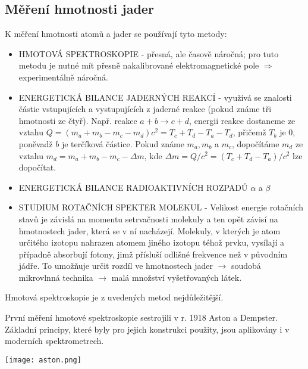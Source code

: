 \documentclass[../../main.tex]{subfiles}
\begin{document}
\subsection{Měření hmotnosti jader}

K měření hmotnosti atomů a jader se používají tyto metody:

\begin{itemize}
	\item HMOTOVÁ SPEKTROSKOPIE - přesná, ale časově náročná; pro tuto metodu je nutné mít přesně nakalibrované elektromagnetické pole $\Rightarrow$ experimentálně náročná.
	\item ENERGETICKÁ BILANCE JADERNÝCH REAKCÍ - využívá se znalosti částic vstupujících a vystupujících z jaderné reakce (pokud známe tři hmotnosti ze čtyř). Např. reakce $a + b \rightarrow c + d$, energii reakce dostaneme ze vztahu $Q = (m_a + m_b - m_c - m_d)c^2 = T_c + T_d - T_a - T_d$, přičemž $T_b$ je 0, poněvadž $b$ je terčíková částice. Pokud známe $m_a, m_b$ a $m_c$, dopočítáme $m_d$ ze vztahu $m_d = m_a + m_b - m_c - \Delta m$, kde $\Delta m = Q/c^2 = (T_c + T_d - T_a)/c^2$ lze dopočítat.
	\item ENERGETICKÁ BILANCE RADIOAKTIVNÍCH ROZPADŮ $\alpha$ a $\beta$
	\item STUDIUM ROTAČNÍCH SPEKTER MOLEKUL - Velikost energie rotačních stavů je závislá na momentu setrvačnosti molekuly a ten opět závisí na hmotnostech jader, která se v ní nacházejí. Molekuly, v kterých je atom určitého izotopu nahrazen atomem jiného izotopu téhož prvku, vysílají a případně absorbují fotony, jimž přísluší odlišné frekvence než v původním jádře. To umožňuje určit rozdíl ve hmotnostech jader $\rightarrow$ soudobá mikrovlnná technika $\rightarrow$ malá množství vyšetřovaných látek.
\end{itemize}

Hmotová spektroskopie je z uvedených metod nejdůležitější.


První měření hmotové spektroskopie sestrojili v r. 1918 Aston a Dempster. Základní principy, které byly pro jejich konstrukci použity, jsou aplikovány i v moderních spektrometrech. 

\begin{center}
	\texttt{[image: aston.png]}
\end{center}
\end{document}
